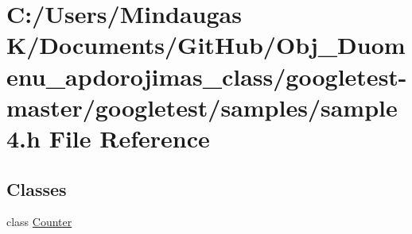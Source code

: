 \hypertarget{googletest-master_2googletest_2samples_2sample4_8h}{}\section{C\+:/\+Users/\+Mindaugas K/\+Documents/\+Git\+Hub/\+Obj\+\_\+\+Duomenu\+\_\+apdorojimas\+\_\+class/googletest-\/master/googletest/samples/sample4.h File Reference}
\label{googletest-master_2googletest_2samples_2sample4_8h}
\subsection*{Classes}
\begin{DoxyCompactItemize}
\item 
class \mbox{\hyperlink{class_counter}{Counter}}
\end{DoxyCompactItemize}
